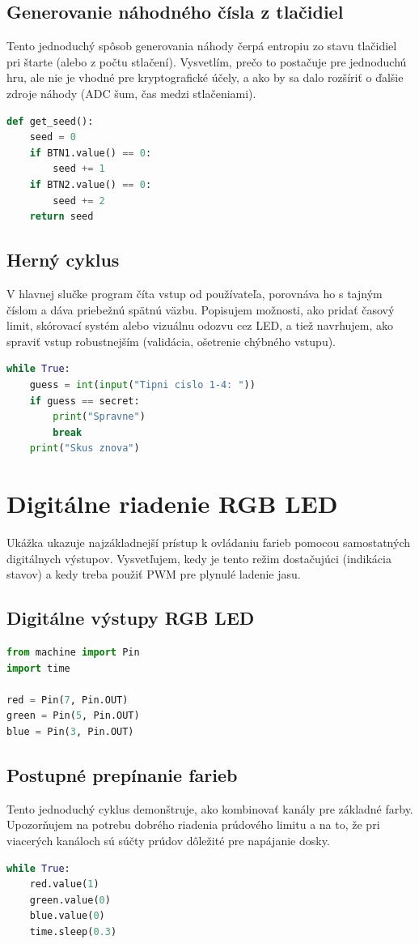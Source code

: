 \subsection*{Generovanie náhodného čísla z tlačidiel}
Tento jednoduchý spôsob generovania náhody čerpá entropiu zo stavu tlačidiel pri štarte (alebo z počtu stlačení). Vysvetlím, prečo to postačuje pre jednoduchú hru, ale nie je vhodné pre kryptografické účely, a ako by sa dalo rozšíriť o ďalšie zdroje náhody (ADC šum, čas medzi stlačeniami).
\begin{lstlisting}[language=Python]
def get_seed():
	seed = 0
	if BTN1.value() == 0:
		seed += 1
	if BTN2.value() == 0:
		seed += 2
	return seed
\end{lstlisting}

\subsection*{Herný cyklus}
V hlavnej slučke program číta vstup od používateľa, porovnáva ho s tajným číslom a dáva priebežnú spätnú väzbu. Popisujem možnosti, ako pridať časový limit, skórovací systém alebo vizuálnu odozvu cez LED, a tiež navrhujem, ako spraviť vstup robustnejším (validácia, ošetrenie chýbného vstupu).
\begin{lstlisting}[language=Python]
while True:
	guess = int(input("Tipni cislo 1-4: "))
	if guess == secret:
		print("Spravne")
		break
	print("Skus znova")
\end{lstlisting}

\clearpage
\section{Digitálne riadenie RGB LED}
Ukážka ukazuje najzákladnejší prístup k ovládaniu farieb pomocou samostatných digitálnych výstupov. Vysvetľujem, kedy je tento režim dostačujúci (indikácia stavov) a kedy treba použiť PWM pre plynulé ladenie jasu.

\subsection*{Digitálne výstupy RGB LED}
\begin{lstlisting}[language=Python]
from machine import Pin
import time

red = Pin(7, Pin.OUT)
green = Pin(5, Pin.OUT)
blue = Pin(3, Pin.OUT)
\end{lstlisting}

\subsection*{Postupné prepínanie farieb}
Tento jednoduchý cyklus demonštruje, ako kombinovať kanály pre základné farby. Upozorňujem na potrebu dobrého riadenia prúdového limitu a na to, že pri viacerých kanáloch sú súčty prúdov dôležité pre napájanie dosky.
\begin{lstlisting}[language=Python]
while True:
	red.value(1)
	green.value(0)
	blue.value(0)
	time.sleep(0.3)
\end{lstlisting}

